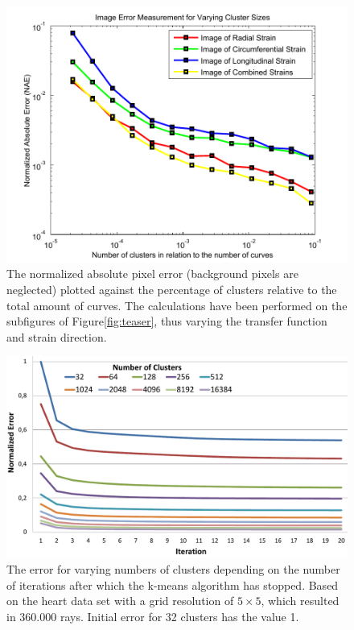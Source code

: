 \documentclass[journal]{vgtc}                %
\begin{document}
\begin{figure}[t]
    \centering 
		\includegraphics[width=1.0\linewidth]{figures/cluster_measurements/clusterErrorPlot}
    \caption{The normalized absolute pixel error (background pixels are neglected) plotted against the percentage of clusters relative to the total amount of curves. The calculations have been performed on the subfigures of Figure\ref{fig:teaser}, thus varying the transfer function and strain direction.}
    \label{fig:clustering_visual_error}
\end{figure}

\begin{figure}[t]
    \centering 
    \includegraphics[width=0.85\linewidth]{figures/diagram_num_clusters}
    \caption{The error for varying numbers of clusters depending on the number of iterations after which the k-means algorithm has stopped. Based on the heart data set with a grid resolution of $5\times5$, which resulted in 360.000 rays. Initial error for 32 clusters has the value 1.}
    \label{fig:clustering_epsilon_error}
\end{figure}
\end{document}
